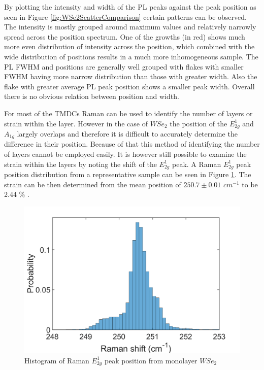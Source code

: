 By plotting the intensity and width of the PL peaks against the peak position as seen in Figure \ref{fig:WSe2ScatterComparison} certain patterns can be observed. The intensity is mostly grouped around maximum values and relatively narrowly spread across the position spectrum. One of the growths (in red) shows much more even distribution of intensity across the position, which combined with the wide distribution of positions results in a much more inhomogeneous sample. The PL FWHM and positions are generally well grouped with flakes with smaller FWHM having more narrow distribution than those with greater width. Also the flake with greater average PL peak position shows a smaller peak width. Overall there is no obvious relation between position and width.


For most of the TMDCs Raman can be used to identify the number of layers or strain within the layer. However in the case of $WSe_2$ the position of the $E^1_{2g}$ and $A_{1g}$ largely overlaps and therefore it is difficult to accurately determine the difference in their position. Because of that this method of identifying the number of layers cannot be employed easily. It is however still possible to examine the strain within the layers by noting the shift of the $E^1_{2g}$ peak. A Raman $E^1_{2g}$ peak position distribution from a representative sample can be seen in Figure \ref{fig:WSe2RamanPositionHistogram1}. The strain can be then determined from the mean position of $250.7 \pm 0.01$ $cm^{-1}$ to be 2.44 {\%} \cite{Dadgar2018}.

\begin{figure}[H]
	\begin{center}
		\includegraphics[scale=0.35]{WSe2/WSe2RamanPositionHistogram1.png}
		\caption{Histogram of Raman $E^1_{2g}$ peak position from monolayer $WSe_2$}
		\label{fig:WSe2RamanPositionHistogram1}
	\end{center}
\end{figure}

